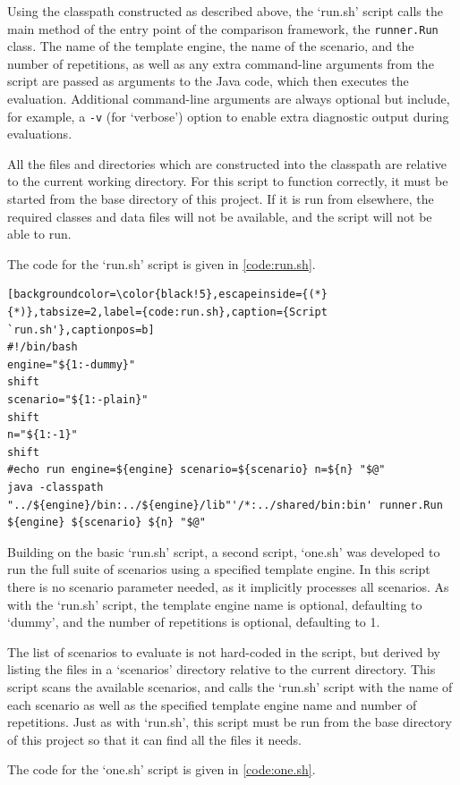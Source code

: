Using the classpath constructed as described above, the `run.sh' script calls the main method of the entry point of the comparison framework, the \verb!runner.Run! class. The name of the template engine, the name of the scenario, and the number of repetitions, as well as any extra command-line arguments from the script are passed as arguments to the Java code, which then executes the evaluation. Additional command-line arguments are always optional but include, for example, a \verb!-v! (for `verbose') option to enable extra diagnostic output during evaluations.

All the files and directories which are constructed into the classpath are relative to the current working directory. For this script to function correctly, it must be started from the base directory of this project. If it is run from elsewhere, the required classes and data files will not be available, and the script will not be able to run.

The code for the `run.sh' script is given in \autoref{code:run.sh}.

\begin{lstlisting}[backgroundcolor=\color{black!5},escapeinside={(*}{*)},tabsize=2,label={code:run.sh},caption={Script `run.sh'},captionpos=b]
#!/bin/bash
engine="${1:-dummy}"
shift
scenario="${1:-plain}"
shift
n="${1:-1}"
shift
#echo run engine=${engine} scenario=${scenario} n=${n} "$@"
java -classpath "../${engine}/bin:../${engine}/lib"'/*:../shared/bin:bin' runner.Run ${engine} ${scenario} ${n} "$@"
\end{lstlisting}

Building on the basic `run.sh' script, a second script, `one.sh' was developed to run the full suite of scenarios using a specified template engine. In this script there is no scenario parameter needed, as it implicitly processes all scenarios. As with the `run.sh' script, the template engine name is optional, defaulting to `dummy', and the number of repetitions is optional, defaulting to 1. 

The list of scenarios to evaluate is not hard-coded in the script, but derived by listing the files in a `scenarios' directory relative to the current directory. This script scans the available scenarios, and calls the `run.sh' script with the name of each scenario as well as the specified template engine name and number of repetitions. Just as with `run.sh', this script must be run from the base directory of this project so that it can find all the files it needs.

The code for the `one.sh' script is given in \autoref{code:one.sh}.

